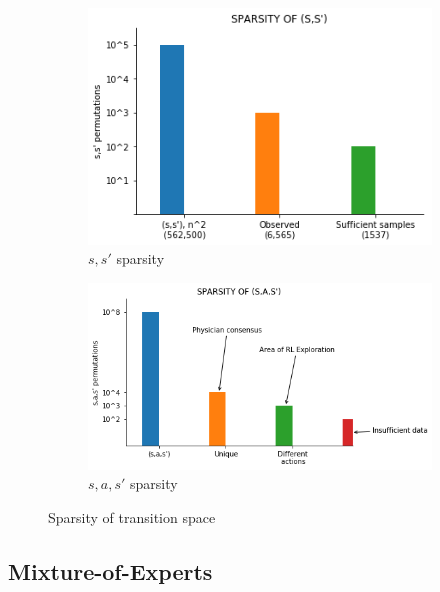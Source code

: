 \documentclass[letterpaper]{article}
\begin{document}
\begin{figure}[H]
  \centering
  \begin{subfigure}{0.45\linewidth}
  \centering
  	\includegraphics[width=1.0\linewidth]{figures/s-s_sparsity.png} %
  	\caption{$s, s'$ sparsity}
  	\label{fig:s-s_sparsity}
  \end{subfigure}%
  \begin{subfigure}{0.55\linewidth}
  \centering
  	\includegraphics[width=1.0\linewidth]{figures/s-a-s_sparsity.png}\hfill
  	\caption{$s, a, s'$ sparsity}
  	\label{fig:s-a-s_sparsity}
  \end{subfigure}
  \caption{Sparsity of transition space}
  \label{fig:transition-space}
\end{figure}


\subsection{Mixture-of-Experts}
\end{document}
